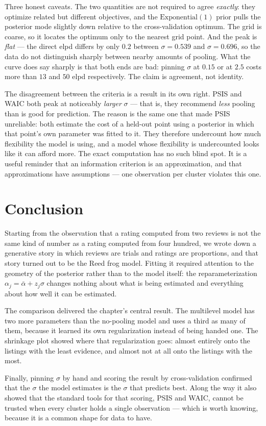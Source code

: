 \documentclass[11pt,a4paper]{article}
\begin{document}
Three honest caveats. The two quantities are not required to agree
\emph{exactly}: they optimize related but different objectives, and the
$\text{Exponential}(1)$ prior pulls the posterior mode slightly down relative to
the cross-validation optimum. The grid is coarse, so it locates the optimum
only to the nearest grid point. And the peak is \emph{flat} --- the direct elpd
differs by only $0.2$ between $\sigma = 0.539$ and $\sigma = 0.696$, so the
data do not distinguish sharply between nearby amounts of pooling. What the
curve does say sharply is that both ends are bad: pinning $\sigma$ at $0.15$ or
at $2.5$ costs more than $13$ and $50$ elpd respectively. The claim is
agreement, not identity.

The disagreement between the criteria is a result in its own right. PSIS and
WAIC both peak at noticeably \emph{larger} $\sigma$ --- that is, they recommend
\emph{less} pooling than is good for prediction. The reason is the same one that
made PSIS unreliable: both estimate the cost of a held-out point using a
posterior in which that point's own parameter was fitted to it. They therefore
undercount how much flexibility the model is using, and a model whose
flexibility is undercounted looks like it can afford more. The exact computation
has no such blind spot. It is a useful reminder that an information criterion is
an approximation, and that approximations have assumptions --- one observation
per cluster violates this one.

\section{Conclusion}

Starting from the observation that a rating computed from two reviews is not the
same kind of number as a rating computed from four hundred, we wrote down a
generative story in which reviews are trials and ratings are proportions, and
that story turned out to be the Reed frog model. Fitting it required attention
to the geometry of the posterior rather than to the model itself: the
reparameterization $\alpha_j = \bar\alpha + z_j \sigma$ changes nothing about
what is being estimated and everything about how well it can be estimated.

The comparison delivered the chapter's central result. The multilevel model has
two more parameters than the no-pooling model and uses a third as many of them,
because it learned its own regularization instead of being handed one. The
shrinkage plot showed where that regularization goes: almost entirely onto the
listings with the least evidence, and almost not at all onto the listings with
the most.

Finally, pinning $\sigma$ by hand and scoring the result by cross-validation
confirmed that the $\sigma$ the model estimates is the $\sigma$ that predicts
best. Along the way it also showed that the standard tools for that scoring,
PSIS and WAIC, cannot be trusted when every cluster holds a single observation
--- which is worth knowing, because it is a common shape for data to have.
\end{document}
